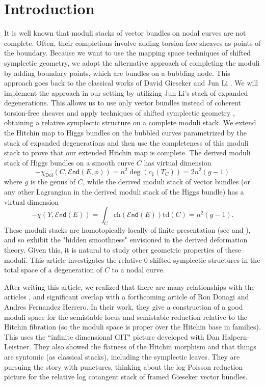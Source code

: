 \documentclass[11pt]{amsart}
\newcommand {\End} {\mathcal E\mathsf{nd}}
\theoremstyle{plain}
\numberwithin{equation}{section}
\theoremstyle{definition}
\theoremstyle{plain}
\begin{document}
\section{\textbf{Introduction}}
It is well known that moduli stacks of vector bundles on nodal curves are not complete. Often, their completions involve adding torsion-free sheaves as points of the boundary. Because we want to use the mapping space techniques of shifted symplectic geometry, we adopt the alternative approach of completing the moduli by adding boundary points, which are bundles on a bubbling node. This approach goes back to the classical works of David Gieseker \cite{12} and Jun Li \cite{Li}. We will implement the approach in our setting by utilizing Jun Li's stack of expanded degenerations. This allows us to use only vector bundles instead of coherent torsion-free sheaves and apply techniques of shifted symplectic geometry \cite{PTVV}, obtaining a relative symplectic structure on a complete moduli stack. We extend the Hitchin map to Higgs bundles on the bubbled curves parametrized by the stack of expanded degenerations and then use the completeness of this moduli stack to prove that our extended Hitchin map is complete.
The derived moduli stack of Higgs bundles on a smooth curve $C$ has virtual dimension \[-\chi_{\mathrm{Dol}}(C, \End(E,\phi)) = n^2 \deg(c_1(T_C)) = 2n^2(g-1)\]
 where $g$ is the genus of $C$, while the derived moduli stack of vector bundles (or any other Lagrangian in the derived moduli stack of the Higgs bundle) has a virtual dimension \[-\chi(Y, \End(E))=\int_{C} \text{ch}(\End(E))\text{td}(C)=n^2(g-1).\] These moduli stacks are homotopically locally of finite presentation (see \cite[\S 2.2.6.3]{TV} and \cite{32a}), and so exhibit the "hidden smoothness" envisioned in the derived deformation theory. Given this, it is natural to study other geometric properties of these moduli. This article investigates the relative $0$-shifted symplectic structures in the total space of a degeneration of $C$ to a nodal curve.

After writing this article, we realized that there are many relationships with the articles \cite{BDD}, \cite{BDDP} and significant overlap with a forthcoming article \cite{DF} of Ron Donagi and Andres Fernandez Herrero. In their work, they give a construction of a good moduli space for the semistable locus and semistable reduction relative to the Hitchin fibration (so the moduli space is proper over the Hitchin base in families). This uses the ``infinite dimensional GIT" picture developed with Dan Halpern-Leistner. They also showed the flatness of the Hitchin morphism and that things are syntomic (as classical stacks), including the symplectic leaves. They are pursuing the story with punctures, thinking about the log Poisson reduction picture for the relative log cotangent stack of framed Gieseker vector bundles.
\end{document}
